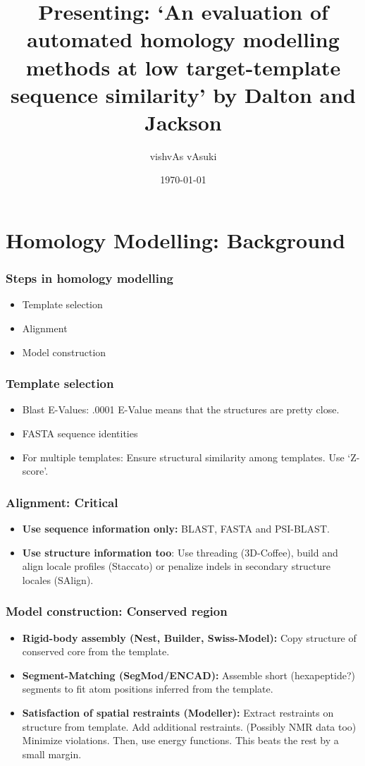 \documentclass{beamer}
\title{Presenting: `An evaluation of automated homology modelling methods at low target-template sequence similarity' by Dalton and Jackson}
\author{vishvAs vAsuki}
\date{\today}
\begin{document}
\frame{\titlepage}

\section[Outline]{}
\frame{\tableofcontents}

\section{Homology Modelling: Background}

\begin{frame}
\frametitle{Steps in homology modelling}
\begin{itemize}
\item Template selection
\item Alignment
\item Model construction
\end{itemize}
\end{frame}

\begin{frame}
\frametitle{Template selection}
\begin{itemize}
\item Blast E-Values: .0001 E-Value means that the structures are pretty close.
\item FASTA sequence identities
\item For multiple templates: Ensure structural similarity among templates. Use `Z-score'.
\end{itemize}
\end{frame}

\begin{frame}
\frametitle{Alignment: Critical}
\begin{itemize}
\item \textbf{Use sequence information only:} BLAST, FASTA and PSI-BLAST.
\item \textbf{Use structure information too}: Use threading (3D-Coffee), build and align locale profiles (Staccato) or penalize indels in secondary structure locales (SAlign).
\end{itemize}
\end{frame}


\begin{frame}
\frametitle{Model construction: Conserved region}
\begin{itemize}
\item \textbf{Rigid-body assembly (Nest, Builder, Swiss-Model):} Copy structure of conserved core from the template. \cite{galperin03}
\item \textbf{Segment-Matching (SegMod/ENCAD):} Assemble short (hexapeptide?) segments to fit atom positions inferred from the template.
\item \textbf{Satisfaction of spatial restraints (Modeller):} Extract restraints on structure from template. Add additional restraints. (Possibly NMR data too) Minimize violations. Then, use energy functions. \cite{galperin03} This beats the rest by a small margin.
\end{itemize}
\end{frame}
\end{document}
